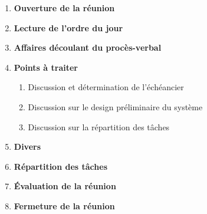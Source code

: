 \documentclass[12pt]{ULojpv}
\begin{document}
\entete
\begin{enumerate}
   \item \textbf{Ouverture de la réunion}
   \item \textbf{Lecture de l'ordre du jour}
   \item \textbf{Affaires découlant du procès-verbal}
   
   \item \textbf{Points à traiter}
      \begin{enumerate}
         \item Discussion et détermination de l'échéancier
         \item Discussion sur le design préliminaire du système
         \item Discussion sur la répartition des tâches
      \end{enumerate}
   \item \textbf{Divers}
   \item \textbf{Répartition des tâches}
   \item \textbf{Évaluation de la réunion}

   \item \textbf{Fermeture de la réunion}
\end{enumerate}
\end{document}
